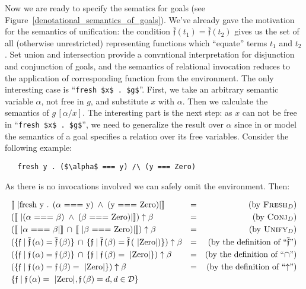 Now we are ready to specify the sematics for goals (see Figure~\ref{denotational_semantics_of_goals}). We've already gave the motivation for
the semantics of unification: the condition $\overline{\mathfrak{f}}(t_1)=\overline{\mathfrak{f}}(t_2)$ gives us the set of all (otherwise
unrestricted) representing functions which ``equate'' terms $t_1$ and $t_2$. Set union and intersection provide a convntional interpretation
for disjunction and conjunction of goals, and the semantics of relational invocation reduces to the application of corresponding
function from the environment. The only interesting case is ``\lstinline|fresh $x$ . $g$|''. First, we take an arbitrary semantic variable $\alpha$,
not free in $g$, and substitute $x$ with $\alpha$. Then we calculate the semantics of $g\,[\alpha/x]$. The interesting part is the next step:
as $x$ can not be free in ``\lstinline|fresh $x$ . $g$|'', we need to generalize the result over $\alpha$ since in or model the semantics of a
goal specifies a relation over its free variables. Consider the following example:

\begin{lstlisting}
   fresh y . ($\alpha$ === y) /\ (y === Zero)
\end{lstlisting}

As there is no invocations involved we can safely omit the environment. Then:

\[
\begin{array}{lcr}
  \sembr{\mbox{\lstinline|fresh y . ($\alpha$ === y) $\,\wedge\,$ (y === Zero)|}}&=&\mbox{(by \textsc{Fresh$_D$})}\\[1mm]
  (\sembr{\mbox{\lstinline|($\alpha$ === $\beta$) $\,\wedge\,$ ($\beta$ === Zero)|}})\uparrow\beta&=&\mbox{(by \textsc{Conj$_D$})}\\[1mm]
  (\sembr{\mbox{\lstinline|$\alpha$ === $\beta$|}} \,\cap\, \sembr{\mbox{\lstinline|$\beta$ === Zero)|}})\uparrow\beta&=&\mbox{(by \textsc{Unify$_D$})}\\[1mm]
  (\{\mathfrak{f}\mid \overline{\mathfrak{f}}\,(\alpha)=\overline{\mathfrak{f}}\,(\beta)\} \,\cap\, \{\mathfrak{f}\mid \overline{\mathfrak{f}}\,(\beta)=\overline{\mathfrak{f}}\,(\mbox{\lstinline|Zero|})\})\uparrow\beta&=&\mbox{(by the definition of ``$\overline{\mathfrak{f}}$'')}\\[1mm]
  (\{\mathfrak{f}\mid \mathfrak{f}\,(\alpha)=\mathfrak{f}\,(\beta)\} \,\cap\, \{\mathfrak{f}\mid \mathfrak{f}\,(\beta)=\mbox{\lstinline|Zero|}\})\uparrow\beta&=&\mbox{(by the definition of ``$\cap$'')}\\[1mm]
  (\{\mathfrak{f}\mid \mathfrak{f}\,(\alpha)=\mathfrak{f}\,(\beta)=\mbox{\lstinline|Zero|}\})\uparrow\beta&=&\mbox{(by the definition of ``$\uparrow$'')}\\[1mm]
  \{\mathfrak{f}\mid \mathfrak{f}\,(\alpha)=\mbox{\lstinline|Zero|}, \mathfrak{f}\,(\beta)=d, d\in\mathcal{D}\}&&
\end{array}
\]

